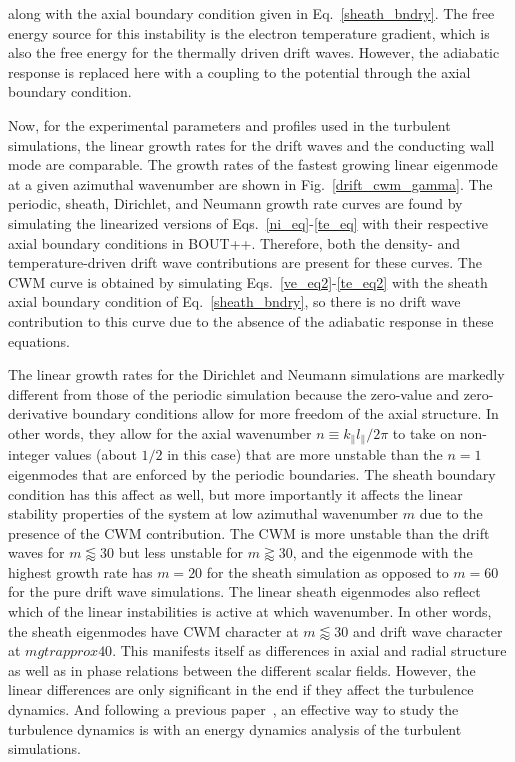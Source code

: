 \documentclass[showpacs,preprintnumbers,amsmath,amssymb,superscriptaddress,aip]{revtex4-1}
\def\para{\parallel}
\begin{document}
along with the axial boundary condition given in Eq.~\ref{sheath_bndry}. The free energy source for this instability is the electron temperature gradient, which is also the free energy
for the thermally driven drift waves. However, the adiabatic response is replaced here with a coupling to the potential through the axial boundary condition.

Now, for the experimental parameters and profiles used in the turbulent simulations, 
the linear growth rates for the drift waves and the conducting wall mode are comparable. The growth rates of the fastest growing linear eigenmode at a given azimuthal wavenumber
are shown in Fig.~\ref{drift_cwm_gamma}.
The periodic, sheath, Dirichlet, and Neumann growth rate curves are found by simulating the linearized versions of Eqs.~\ref{ni_eq}-\ref{te_eq} with their respective
axial boundary conditions in BOUT++. Therefore, both the density- and temperature-driven drift wave contributions are present for these curves.
The CWM curve is obtained by simulating Eqs.~\ref{ve_eq2}-\ref{te_eq2} with the sheath axial boundary condition of Eq.~\ref{sheath_bndry}, so there is no drift wave contribution to this curve
due to the absence of the adiabatic response in these equations. 

The linear growth rates for the Dirichlet and Neumann simulations are markedly different from those of the periodic simulation because the zero-value and zero-derivative boundary conditions
allow for more freedom of the axial structure. In other words, they allow for the axial wavenumber $n \equiv k_\para l_\para / 2 \pi$ to take on non-integer values (about $1/2$ in this case) that
are more unstable than the $n=1$ eigenmodes that are enforced by the periodic boundaries. The sheath boundary condition has this affect as well, but more importantly
it affects the linear stability properties of the system at low azimuthal wavenumber $m$ due to the presence of the CWM contribution. The CWM is more unstable
than the drift waves for $m \lessapprox 30$ but less unstable for $m \gtrapprox 30$, and the eigenmode with the highest growth rate has $m=20$ for the sheath simulation as opposed to $m=60$ for the pure
drift wave simulations.
The linear sheath eigenmodes also reflect which of the linear instabilities is active at which wavenumber. In other words, the sheath eigenmodes have CWM character at $m \lessapprox 30$ and drift wave
character at $m gtrapprox 40$. This manifests itself as differences in axial and radial structure as well as in phase relations between the different scalar fields. However, the linear differences
are only significant in the end if they affect the turbulence dynamics. And following a previous paper~\cite{friedman2012b}, an effective way to study the turbulence dynamics is with
an energy dynamics analysis of the turbulent simulations.
\end{document}
